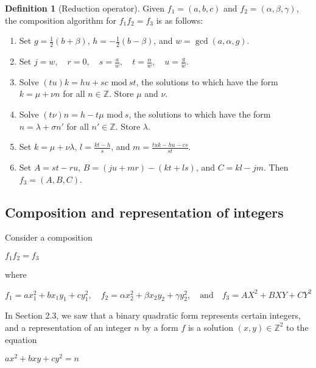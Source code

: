 \documentclass{article}
\theoremstyle{definition}
\newtheorem{definition}{Definition}[section]
\theoremstyle{theorem}
\theoremstyle{example}
\theoremstyle{corollary}
\begin{document}
\begin{definition}[Reduction operator]
Given \(f_{1} = (a, b, c)\) and \(f_{2} = (\alpha, \beta, \gamma)\), the composition algorithm for \(f_{1} f_{2} = f_{3}\) is as follows:
\begin{enumerate}
\item Set \(g = \frac{1}{2} (b + \beta)\), \(h = - \frac{1}{2} (b - \beta)\), and \(w = \gcd(a, \alpha, g)\).
\item Set \(j = w, \quad r = 0, \quad s = \frac{a}{w}, \quad t = \frac{\alpha}{w}, \quad u = \frac{g}{w}\).
\item Solve \((tu)k = hu + sc \, \, \textrm{mod} \ st\), the solutions to which have the form \(k = \mu + \nu n\) for all \(n \in \mathbb{Z}\). Store \(\mu\) and \(\nu\).
\item Solve \((t\nu)n = h - t\mu \, \, \textrm{mod} \ s\), the solutions to which have the form \(n = \lambda + \sigma n'\) for all \(n' \in \mathbb{Z}\). Store \(\lambda\).
\item Set \(k = \mu + \nu \lambda\), \(l = \frac{kt - h}{s}\), and \(m = \frac{tuk - hu - cs}{st}\).
\item Set \(A = s t - r u\), \(B = (j u + m r) - (k t + l s)\), and \(C = k l - j m\). Then \(f_{3} = (A, B, C)\).
\end{enumerate}






\bigskip

\subsection{Composition and representation of integers}

\bigskip

Consider a composition
\begin{center}
\(f_{1} f_{2} = f_{3}\)
\end{center}
where
\begin{center}
\(f_{1} = a x_{1}^{2} + b x_{1} y_{1} + c y_{1}^{2}, \quad f_{2} = \alpha x_{2}^{2} + \beta x_{2} y_{2} + \gamma y_{2}^{2}, \quad \textrm{and} \quad f_{3} = AX^{2} + BXY + CY^{2}\)
\end{center}

\bigskip

In Section 2.3, we saw that a binary quadratic form represents certain integers, and a representation of an integer \(n\) by a form \(f\) is a solution \((x, y) \in \mathbb{Z}^{2}\) to the equation
\begin{center}
\(ax^{2} + bxy + cy^{2} = n\)
\end{center}


\end{definition}
\end{document}
